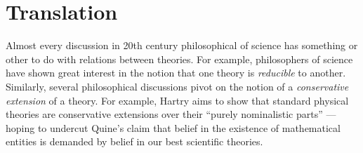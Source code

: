 




















\section{Translation}





Almost every discussion in 20th century philosophical of science has
something or other to do with relations between theories.  For
example, philosophers of science have shown great interest in the
notion that one theory is \emph{reducible} to another.  Similarly,
several philosophical discussions pivot on the notion of a
\emph{conservative extension} of a theory.  For example, Hartry
\cite{field2016} aims to show that standard physical theories are
conservative extensions over their ``purely nominalistic parts'' ---
hoping to undercut Quine's claim that belief in the existence of
mathematical entities is demanded by belief in our best scientific
theories.

